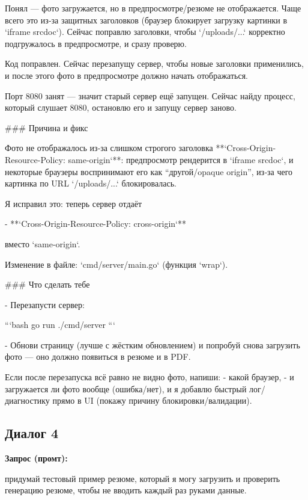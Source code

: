 \documentclass[a4paper, 14pt]{extarticle} %
\begin{document}
\begin{AnswerBlock}

Понял — фото загружается, но в предпросмотре/резюме не отображается. Чаще всего это из‑за защитных заголовков (браузер блокирует загрузку картинки в `iframe srcdoc`). Сейчас поправлю заголовки, чтобы `/uploads/...` корректно подгружалось в предпросмотре, и сразу проверю.

Код поправлен. Сейчас перезапущу сервер, чтобы новые заголовки применились, и после этого фото в предпросмотре должно начать отображаться.

Порт 8080 занят — значит старый сервер ещё запущен. Сейчас найду процесс, который слушает 8080, остановлю его и запущу сервер заново.

### Причина и фикс

Фото не отображалось из‑за слишком строгого заголовка **`Cross-Origin-Resource-Policy: same-origin`**: предпросмотр рендерится в `iframe srcdoc`, и некоторые браузеры воспринимают его как “другой/opaque origin”, из‑за чего картинка по URL `/uploads/...` блокировалась.

Я исправил это: теперь сервер отдаёт

- **`Cross-Origin-Resource-Policy: cross-origin`**

вместо `same-origin`.

Изменение в файле: `cmd/server/main.go` (функция `wrap`).

### Что сделать тебе

- Перезапусти сервер:

```bash
go run ./cmd/server
```

- Обнови страницу (лучше с жёстким обновлением) и попробуй снова загрузить фото — оно должно появиться в резюме и в PDF.

Если после перезапуска всё равно не видно фото, напиши:
- какой браузер,
- и загружается ли фото вообще (ошибка/нет),
и я добавлю быстрый лог/диагностику прямо в UI (покажу причину блокировки/валидации).

\end{AnswerBlock}

\subsection*{Диалог 4}

\textbf{Запрос (промт):}

\begin{PromptBlock}

придумай тестовый пример резюме, который я могу загрузить и проверить генерацию резюме, чтобы не вводить каждый раз руками данные.

\end{PromptBlock}
\end{document}
